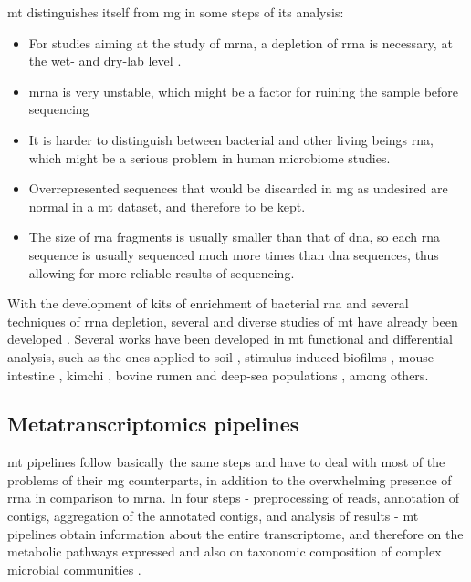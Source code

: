 \documentclass[
  oneside,
  11pt, a4paper,
  footinclude=true,
  headinclude=true,
  cleardoublepage=empty
]{scrbook}
\begin{document}
    \gls{mt} distinguishes itself from \gls{mg} in some steps of its analysis: 
    \begin{itemize}
        \item For studies aiming at the study of \gls{mrna}, a depletion of \gls{rrna} is necessary, at the wet- and dry-lab level \citep{Narayanasamy2016}.
        \item \gls{mrna} is very unstable, which might be a factor for ruining the sample before sequencing
        \item It is harder to distinguish between bacterial and other living beings \gls{rna}, which might be a serious problem in human microbiome studies.
        \item Overrepresented sequences that would be discarded in \gls{mg} as undesired are normal in a \gls{mt} dataset, and therefore to be kept.
        \item The size of \gls{rna} fragments is usually smaller than that of \gls{dna}, so each \gls{rna} sequence is usually sequenced much more times than \gls{dna} sequences, thus allowing for more reliable results of sequencing.
    \end{itemize}
    
    With the development of kits of enrichment of bacterial \gls{rna} and several techniques of \gls{rrna} depletion, several and diverse studies of \gls{mt} have already been developed \citep{Aguiar-pulido2016}. Several works have been developed in \gls{mt} functional and differential analysis, such as the ones applied to soil \citep{Carvalhais2012}, stimulus-induced biofilms \citep{Ishii2015}, mouse intestine \citep{10.1371/journal.pone.0036009}, kimchi \citep{Jung2013}, bovine rumen \citep{Poulsen2013} and deep-sea populations \citep{Baker2013}, among others.
    
    \subsection{Metatranscriptomics pipelines}
    
    \gls{mt} pipelines follow basically the same steps and have to deal with most of the problems of their \gls{mg} counterparts, in addition to the overwhelming presence of \gls{rrna} in comparison to \gls{mrna}. In four steps - preprocessing of reads, annotation of contigs, aggregation of the annotated contigs, and analysis of results - \gls{mt} pipelines obtain information about the entire transcriptome, and therefore on the metabolic pathways expressed and also on taxonomic composition of complex microbial communities \citep{Westreich2016}. 
    
\end{document}
